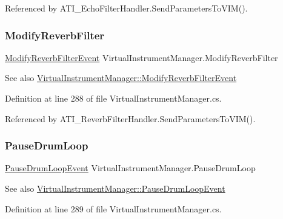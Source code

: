 Referenced by A\+T\+I\+\_\+\+Echo\+Filter\+Handler.\+Send\+Parameters\+To\+V\+I\+M().

\mbox{\label{group___v_i_m_events_gaadd137e073cb3849f610a46e0d032858}} 
\subsubsection{\texorpdfstring{Modify\+Reverb\+Filter}{ModifyReverbFilter}}
{\footnotesize\ttfamily \hyperlink{group___v_i_m_event_types_class_virtual_instrument_manager_1_1_modify_reverb_filter_event}{Modify\+Reverb\+Filter\+Event} Virtual\+Instrument\+Manager.\+Modify\+Reverb\+Filter}

\begin{DoxySeeAlso}{See also}
\hyperlink{group___v_i_m_event_types_class_virtual_instrument_manager_1_1_modify_reverb_filter_event}{Virtual\+Instrument\+Manager\+::\+Modify\+Reverb\+Filter\+Event} 
\end{DoxySeeAlso}


Definition at line 288 of file Virtual\+Instrument\+Manager.\+cs.



Referenced by A\+T\+I\+\_\+\+Reverb\+Filter\+Handler.\+Send\+Parameters\+To\+V\+I\+M().

\mbox{\label{group___v_i_m_events_ga6de00a430321852cc3c8c4a213d62c70}} 
\subsubsection{\texorpdfstring{Pause\+Drum\+Loop}{PauseDrumLoop}}
{\footnotesize\ttfamily \hyperlink{group___v_i_m_event_types_class_virtual_instrument_manager_1_1_pause_drum_loop_event}{Pause\+Drum\+Loop\+Event} Virtual\+Instrument\+Manager.\+Pause\+Drum\+Loop}

\begin{DoxySeeAlso}{See also}
\hyperlink{group___v_i_m_event_types_class_virtual_instrument_manager_1_1_pause_drum_loop_event}{Virtual\+Instrument\+Manager\+::\+Pause\+Drum\+Loop\+Event} 
\end{DoxySeeAlso}


Definition at line 289 of file Virtual\+Instrument\+Manager.\+cs.



